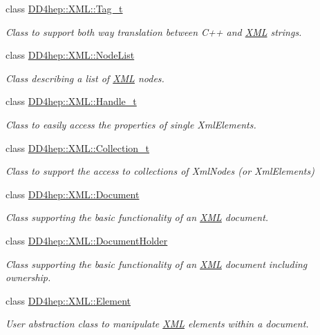\begin{DoxyCompactItemize}
class \hyperlink{class_d_d4hep_1_1_x_m_l_1_1_tag__t}{D\+D4hep\+::\+X\+M\+L\+::\+Tag\+\_\+t}
\begin{DoxyCompactList}\small\item\em Class to support both way translation between C++ and \hyperlink{namespace_d_d4hep_1_1_x_m_l}{X\+ML} strings. \end{DoxyCompactList}\item 
class \hyperlink{class_d_d4hep_1_1_x_m_l_1_1_node_list}{D\+D4hep\+::\+X\+M\+L\+::\+Node\+List}
\begin{DoxyCompactList}\small\item\em Class describing a list of \hyperlink{namespace_d_d4hep_1_1_x_m_l}{X\+ML} nodes. \end{DoxyCompactList}\item 
class \hyperlink{class_d_d4hep_1_1_x_m_l_1_1_handle__t}{D\+D4hep\+::\+X\+M\+L\+::\+Handle\+\_\+t}
\begin{DoxyCompactList}\small\item\em Class to easily access the properties of single Xml\+Elements. \end{DoxyCompactList}\item 
class \hyperlink{class_d_d4hep_1_1_x_m_l_1_1_collection__t}{D\+D4hep\+::\+X\+M\+L\+::\+Collection\+\_\+t}
\begin{DoxyCompactList}\small\item\em Class to support the access to collections of Xml\+Nodes (or Xml\+Elements) \end{DoxyCompactList}\item 
class \hyperlink{class_d_d4hep_1_1_x_m_l_1_1_document}{D\+D4hep\+::\+X\+M\+L\+::\+Document}
\begin{DoxyCompactList}\small\item\em Class supporting the basic functionality of an \hyperlink{namespace_d_d4hep_1_1_x_m_l}{X\+ML} document. \end{DoxyCompactList}\item 
class \hyperlink{class_d_d4hep_1_1_x_m_l_1_1_document_holder}{D\+D4hep\+::\+X\+M\+L\+::\+Document\+Holder}
\begin{DoxyCompactList}\small\item\em Class supporting the basic functionality of an \hyperlink{namespace_d_d4hep_1_1_x_m_l}{X\+ML} document including ownership. \end{DoxyCompactList}\item 
class \hyperlink{class_d_d4hep_1_1_x_m_l_1_1_element}{D\+D4hep\+::\+X\+M\+L\+::\+Element}
\begin{DoxyCompactList}\small\item\em User abstraction class to manipulate \hyperlink{namespace_d_d4hep_1_1_x_m_l}{X\+ML} elements within a document. \end{DoxyCompactList}\item 

\end{DoxyCompactItemize}
